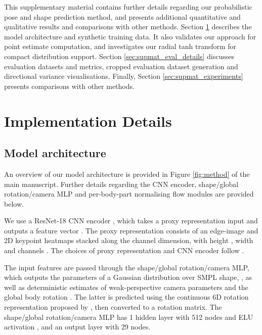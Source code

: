 \appendix
\label{sec:appendix}

This supplementary material contains further details regarding our probabilistic pose and shape prediction method, and presents additional quantitative and qualitative results and comparisons with other methods. Section \ref{sec:supmat_imp_details} describes the model architecture and synthetic training data. It also validates our approach for point estimate computation, and investigates our radial tanh transform for compact distribution support. Section \ref{sec:supmat_eval_details} discusses evaluation datasets and metrics, cropped evaluation dataset generation and directional variance visualisations. Finally, Section \ref{sec:supmat_experiments} presents comparisons with other methods.

\section{Implementation Details}
\label{sec:supmat_imp_details}

\subsection{Model architecture}

An overview of our model architecture is provided in Figure \ref{fig:method} of the main manuscript. Further details regarding the CNN encoder, shape/global rotation/camera MLP and per-body-part normalising flow modules are provided below.

We use a ResNet-18 CNN encoder \cite{He2015}, which takes a proxy representation input  and outputs a feature vector . The proxy representation consists of an edge-image and 2D keypoint heatmaps stacked along the channel dimension, with height , width  and channels . The choices of proxy representation and CNN encoder follow \cite{sengupta2021hierprobhuman}.

The input features  are passed through the shape/global rotation/camera MLP, which outputs the parameters of a Gaussian distribution over SMPL \cite{SMPL:2015} shape, , as well as deterministic estimates of weak-perspective camera parameters  and the global body rotation . The latter is predicted using the continuous 6D rotation representation proposed by \cite{Zhou_2019_CVPR}, then converted to a rotation matrix. The shape/global rotation/camera MLP has 1 hidden layer with 512 nodes and ELU activation \cite{clevert2016elu}, and an output layer with 29 nodes.


